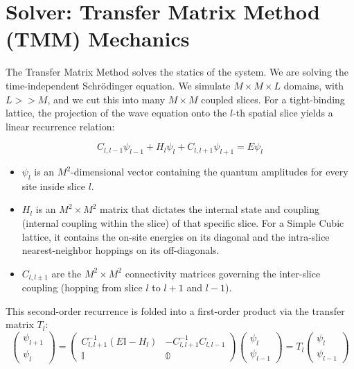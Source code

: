 \documentclass[11pt,a4paper]{article}
\begin{document}
\section{Solver: Transfer Matrix Method (TMM) Mechanics}

The Transfer Matrix Method solves the statics of the system. We are solving the time-independent Schrödinger equation. We simulate $M \times M \times L$ domains, with $L >> M$, and we cut this into many $M \times M$ coupled slices. For a tight-binding lattice, the projection of the wave equation onto the $l$-th spatial slice yields a linear recurrence relation:

$$C_{l, l-1} \psi_{l-1} + H_l \psi_l + C_{l, l+1} \psi_{l+1} = E \psi_l$$

\begin{itemize}
    \item $\psi_l$ is an $M^2$-dimensional vector containing the quantum amplitudes for every site inside slice $l$.
    \item $H_l$ is an $M^2 \times M^2$ matrix that dictates the internal state and coupling (internal coupling within the slice) of that specific slice. For a Simple Cubic lattice, it contains the on-site energies on its diagonal and the intra-slice nearest-neighbor hoppings on its off-diagonals.
    \item $C_{l, l \pm 1}$ are the $M^2 \times M^2$ connectivity matrices governing the inter-slice coupling (hopping from slice $l$ to $l+1$ and $l-1$).
\end{itemize}

This second-order recurrence is folded into a first-order product via the transfer matrix $T_l$:
\begin{equation}
\begin{pmatrix} \psi_{l+1} \\ \psi_l \end{pmatrix} = \begin{pmatrix} C_{l, l+1}^{-1}(E \mathbb{I} - H_l) & -C_{l, l+1}^{-1} C_{l, l-1} \\ \mathbb{I} & \mathbb{0} \end{pmatrix} \begin{pmatrix} \psi_l \\ \psi_{l-1} \end{pmatrix} = T_l \begin{pmatrix} \psi_l \\ \psi_{l-1} \end{pmatrix}
\end{equation}
\end{document}
